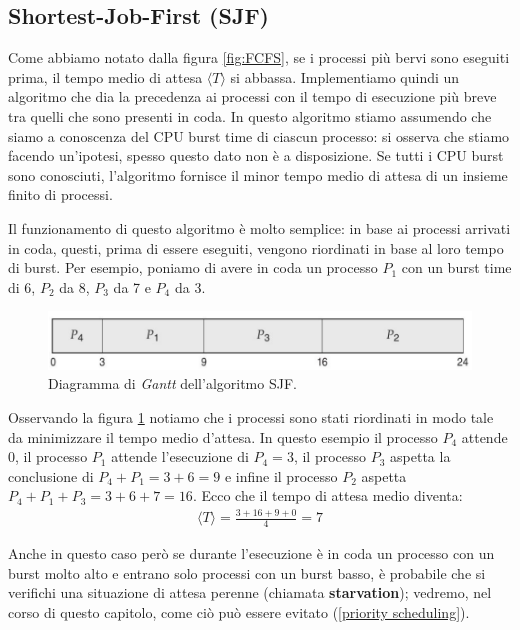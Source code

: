 \subsection{Shortest-Job-First (SJF)}\label{SJF}
Come abbiamo notato dalla figura \ref{fig:FCFS}, se i processi più bervi sono eseguiti prima, il tempo medio di attesa $\langle T \rangle$ si abbassa. Implementiamo quindi un algoritmo che dia la precedenza ai processi con il tempo di esecuzione più breve tra quelli che sono presenti in coda. In questo algoritmo stiamo assumendo che siamo a conoscenza del CPU burst time di ciascun processo: si osserva che stiamo facendo un'ipotesi, spesso questo dato non è a disposizione. Se tutti i CPU burst sono conosciuti, l'algoritmo fornisce il minor tempo medio di attesa di un insieme finito di processi.

Il funzionamento di questo algoritmo è molto semplice: in base ai processi arrivati in coda, questi, prima di essere eseguiti, vengono riordinati in base al loro tempo di burst. Per esempio, poniamo di avere in coda un processo $P_1$ con un burst time di 6, $P_2$ da 8, $P_3$ da 7 e $P_4$ da 3.
\begin{figure}[h]
    \centering
    \includegraphics[width = .7\textwidth]{../res/imgs/CPU scheduling/SJF.png}
    \caption{Diagramma di \textit{Gantt} dell'algoritmo SJF.}
    \label{fig:SJF}
\end{figure}
Osservando la figura \ref{fig:SJF} notiamo che i processi sono stati riordinati in modo tale da minimizzare il tempo medio d'attesa. In questo esempio il processo $P_4$ attende 0, il processo $P_1$ attende l'esecuzione di $P_4 = 3$, il processo $P_3$ aspetta la conclusione di $P_4 + P_1 = 3 + 6 = 9$ e infine il processo $P_2$ aspetta $P_4 + P_1 + P_3 = 3 + 6 + 7 = 16$. Ecco che il tempo di attesa medio diventa:
\begin{gather*}
    \langle T \rangle = \frac{3 + 16 + 9 + 0}{4} = 7
\end{gather*}

Anche in questo caso però se durante l'esecuzione è in coda un processo con un burst molto alto e entrano solo processi con un burst basso, è probabile che si verifichi una situazione di attesa perenne (chiamata \textbf{starvation}); vedremo, nel corso di questo capitolo, come ciò può essere evitato (\ref{priority scheduling}).
% 
